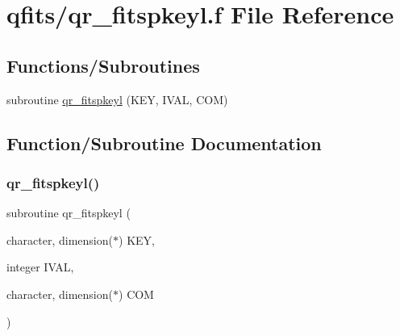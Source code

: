 \hypertarget{qr__fitspkeyl_8f}{}\section{qfits/qr\+\_\+fitspkeyl.f File Reference}
\label{qr__fitspkeyl_8f}
\subsection*{Functions/\+Subroutines}
\begin{DoxyCompactItemize}
\item 
subroutine \hyperlink{qr__fitspkeyl_8f_a0e0d84fc4e149f0fc12729e4e20a6171}{qr\+\_\+fitspkeyl} (K\+EY, I\+V\+AL, C\+OM)
\end{DoxyCompactItemize}


\subsection{Function/\+Subroutine Documentation}
\mbox{\label{qr__fitspkeyl_8f_a0e0d84fc4e149f0fc12729e4e20a6171}} 
\subsubsection{\texorpdfstring{qr\+\_\+fitspkeyl()}{qr\_fitspkeyl()}}
{\footnotesize\ttfamily subroutine qr\+\_\+fitspkeyl (\begin{DoxyParamCaption}\item[{character, dimension($\ast$)}]{K\+EY,  }\item[{integer}]{I\+V\+AL,  }\item[{character, dimension($\ast$)}]{C\+OM }\end{DoxyParamCaption})}


